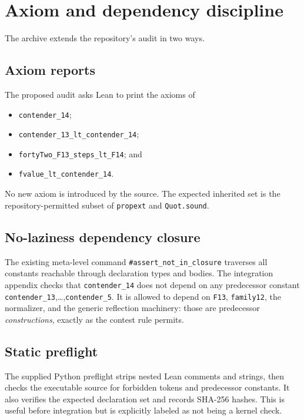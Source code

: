 \documentclass[11pt]{article}
\theoremstyle{definition}
\newcommand{\lean}[1]{\texttt{#1}}
\begin{document}
\section{Axiom and dependency discipline}

The archive extends the repository's audit in two ways.

\subsection{Axiom reports}
The proposed audit asks Lean to print the axioms of
\begin{itemize}
  \item \lean{contender\_14};
  \item \lean{contender\_13\_lt\_contender\_14};
  \item \lean{fortyTwo\_F13\_steps\_lt\_F14}; and
  \item \lean{fvalue\_lt\_contender\_14}.
\end{itemize}
No new axiom is introduced by the source.  The expected inherited set is the
repository-permitted subset of \lean{propext} and \lean{Quot.sound}.

\subsection{No-laziness dependency closure}
The existing meta-level command \lean{\#assert\_not\_in\_closure} traverses all
constants reachable through declaration types and bodies.  The integration
appendix checks that \lean{contender\_14} does not depend on any predecessor
constant \lean{contender\_13},\ldots,\lean{contender\_5}.  It is allowed to
depend on \lean{F13}, \lean{family12}, the normalizer, and the generic
reflection machinery: those are predecessor \emph{constructions}, exactly as
the contest rule permits.

\subsection{Static preflight}
The supplied Python preflight strips nested Lean comments and strings, then
checks the executable source for forbidden tokens and predecessor constants.
It also verifies the expected declaration set and records SHA-256 hashes.  This
is useful before integration but is explicitly labeled as not being a kernel
check.

\end{document}
